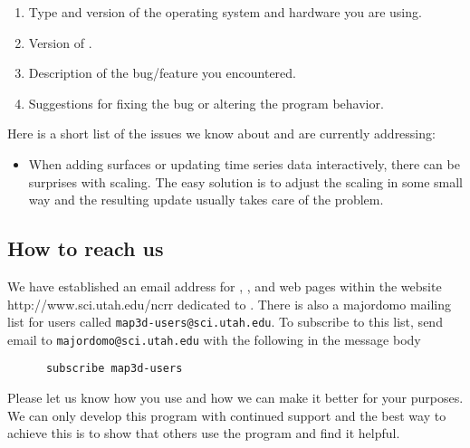 \begin{enumerate}
  \item Type and version of the operating system and hardware you are using.
  \item Version of \map{}.
  \item Description of the bug/feature you encountered.
  \item Suggestions for fixing the bug or altering the program behavior.
\end{enumerate}


Here is a short list of the issues we know about and are currently addressing:

\begin{itemize}
  \item When adding surfaces or updating time series data interactively,
    there can be surprises with scaling.  The easy solution is to adjust
    the scaling in some small way and the resulting update usually takes
    care of the problem.
\end{itemize}



\subsection{How to reach us}

We have established an email address for \map{},
, and
web pages within the website 
{http://www.sci.utah.edu/ncrr} dedicated to \map{}.  There is also a
majordomo mailing list for \map{} users called
\texttt{map3d-users@sci.utah.edu}.  To subscribe to this list, send email to
\texttt{majordomo@sci.utah.edu} with the following in the message body\\
%
\begin{verbatim}
      subscribe map3d-users
\end{verbatim}

Please let us know how you use \map{} and how we can make it better for
your purposes.  We can only develop this program with continued
support and the best way to achieve this is to show that others use the
program and find it helpful.






